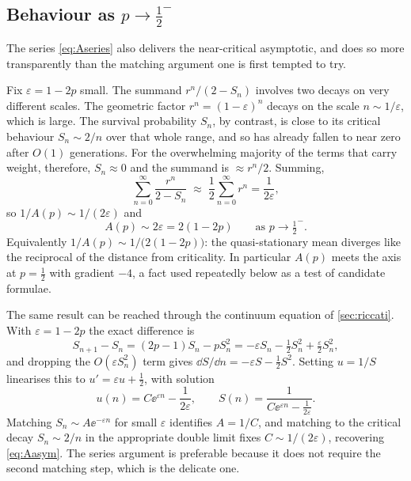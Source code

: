 \subsection{Behaviour as \texorpdfstring{$p\to\tfrac12^-$}{p to 1/2}}
\label{sec:asymptotic}

The series \cref{eq:Aseries} also delivers the near-critical asymptotic, and does so
more transparently than the matching argument one is first tempted to try.

Fix $\varepsilon = 1-2p$ small. The summand $r^n/(2-S_n)$ involves two decays on very
different scales. The geometric factor $r^n = (1-\varepsilon)^n$ decays on the scale
$n\sim1/\varepsilon$, which is large. The survival probability $S_n$, by contrast, is
close to its critical behaviour $S_n\sim2/n$ over that whole range, and so has already
fallen to near zero after $O(1)$ generations. For the overwhelming majority of the terms
that carry weight, therefore, $S_n\approx0$ and the summand is $\approx r^n/2$. Summing,
\begin{equation*}
\sum_{n=0}^{\infty}\frac{r^n}{2-S_n} \;\approx\; \frac12\sum_{n=0}^{\infty}r^n = \frac{1}{2\varepsilon},
\end{equation*}
so $1/A(p)\sim 1/(2\varepsilon)$ and
\begin{equation}
\label{eq:Aasym}
\boxed{\;A(p) \sim 2\varepsilon = 2(1-2p)\qquad\text{as } p\to\tfrac12^-.\;}
\end{equation}
Equivalently $1/A(p)\sim 1/\bigl(2(1-2p)\bigr)$: the quasi-stationary mean diverges
like the reciprocal of the distance from criticality. In particular $A(p)$ meets the
axis at $p=\tfrac12$ with gradient $-4$, a fact used repeatedly below as a test of
candidate formulae.

The same result can be reached through the continuum equation of \cref{sec:riccati}.
With $\varepsilon = 1-2p$ the exact difference is
\begin{equation*}
S_{n+1}-S_n = (2p-1)S_n - pS_n^2 = -\varepsilon S_n - \tfrac12 S_n^2 + \tfrac{\varepsilon}{2}S_n^2 ,
\end{equation*}
and dropping the $O(\varepsilon S_n^2)$ term gives
$\dd S/\dd n = -\varepsilon S - \tfrac12 S^2$. Setting $u = 1/S$ linearises this to
$u' = \varepsilon u + \tfrac12$, with solution
\begin{equation*}
u(n) = C\ee^{\varepsilon n} - \frac{1}{2\varepsilon},
\qquad
S(n) = \frac{1}{C\ee^{\varepsilon n} - \frac{1}{2\varepsilon}} .
\end{equation*}
Matching $S_n\sim A\ee^{-\varepsilon n}$ for small $\varepsilon$ identifies $A = 1/C$,
and matching to the critical decay $S_n\sim2/n$ in the appropriate double limit fixes
$C\sim1/(2\varepsilon)$, recovering \cref{eq:Aasym}. The series argument is preferable
because it does not require the second matching step, which is the delicate one.

